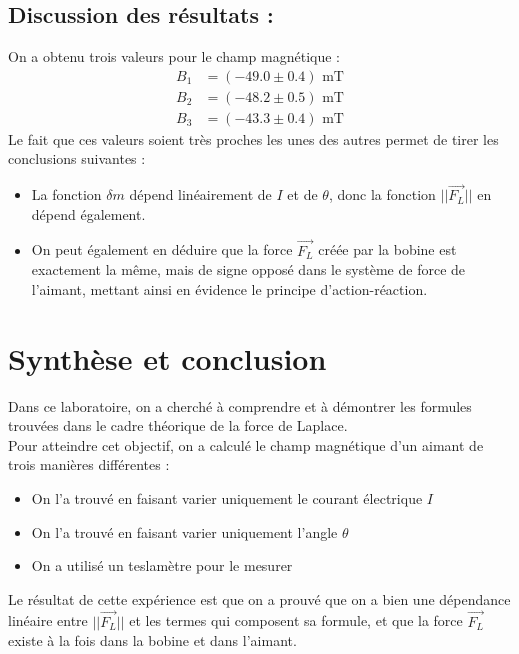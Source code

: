 \documentclass[12pt,a4paper]{article}
\begin{document}
    \subsection{Discussion des résultats :}
    On a obtenu trois valeurs pour le champ magnétique :
    \begin{align*}
        B_1 &= (-49.0 \pm 0.4) \textrm{ mT} \\
        B_2 &= (-48.2 \pm 0.5) \textrm{ mT} \\
        B_3 &= (-43.3 \pm 0.4) \textrm{ mT}
    \end{align*}
    Le fait que ces valeurs soient très proches les unes des autres permet de tirer les conclusions suivantes :
    \begin{itemize}
        \item La fonction $\delta m$ dépend linéairement de $I$ et de $\theta$, donc la fonction $||\vec{F_L}||$ en dépend également.
        \item On peut également en déduire que la force $\vec{F_L}$ créée par la bobine est exactement la même, mais de signe opposé dans le système de force de l'aimant, mettant ainsi en évidence le principe d'action-réaction.
    \end{itemize}
    \section{Synthèse et conclusion}
    Dans ce laboratoire, on a cherché à comprendre et à démontrer les formules trouvées dans le cadre théorique de la force de Laplace. \\
    Pour atteindre cet objectif, on a calculé le champ magnétique d'un aimant de trois manières différentes :
    \begin{itemize}
        \item On l'a trouvé en faisant varier uniquement le courant électrique $I$
        \item On l'a trouvé en faisant varier uniquement l'angle $\theta$ 
        \item On a utilisé un teslamètre pour le mesurer
    \end{itemize}
    Le résultat de cette expérience est que on a prouvé que on a bien une dépendance linéaire entre $||\vec{F_L}||$ et les termes qui composent sa formule, et que la force $\vec{F_L}$ existe à la fois dans la bobine et dans l'aimant. 
\end{document}
